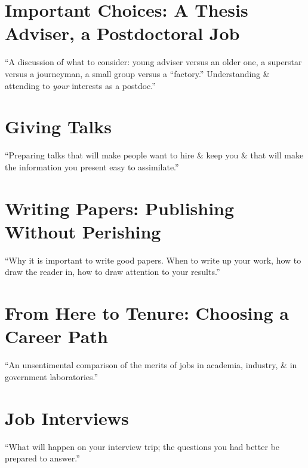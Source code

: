 \documentclass[oneside]{book}
\numberwithin{equation}{section}
\begin{document}
\section{Important Choices: A Thesis Adviser, a Postdoctoral Job}

\begin{flushright}
	``A discussion of what to consider: young adviser versus an older one, a superstar versus a journeyman, a small group versus a ``factory.'' Understanding \& attending to \emph{your} interests as a postdoc.''
\end{flushright}

\section{Giving Talks}

\begin{flushright}
	``Preparing talks that will make people want to hire \& keep you \& that will make the information you present easy to assimilate.''
\end{flushright}

\section{Writing Papers: Publishing Without Perishing}

\begin{flushright}
	``Why it is important to write good papers. When to write up your work, how to draw the reader in, how to draw attention to your results.''
\end{flushright}

\section{From Here to Tenure: Choosing a Career Path}

\begin{flushright}
	``An unsentimental comparison of the merits of jobs in academia, industry, \& in government laboratories.''
\end{flushright}

\section{Job Interviews}

\begin{flushright}
	``What will happen on your interview trip; the questions you had better be prepared to answer.''
\end{flushright}
\end{document}

